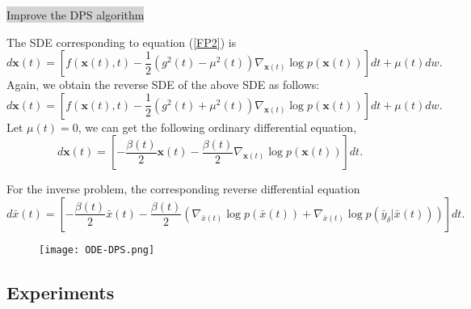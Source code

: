 \documentclass[mathserif,envcountsect,compress,8pt]{beamer}
\begin{document}
\begin{frame}
	\setlength{\parskip}{0.6\baselineskip}
	\colorbox {lightgray}{{\color{blue}Improve the DPS algorithm}}
	
	\vspace{20pt}
	
	The SDE corresponding to equation (\ref{FP2}) is
	\begin{equation*}
		d\mathbf{x}(t)=[f(\mathbf{x}(t),t)-\frac{1}{2}(g^2(t)-\mu^2(t))\nabla_{\mathbf{x}(t)}\log p(\mathbf{x}(t))]dt+\mu(t)dw.
	\end{equation*}
	Again, we obtain the reverse SDE of the above SDE as follows:
	\begin{equation*}
		d\mathbf{x}(t)=[f(\mathbf{x}(t),t)-\frac{1}{2}(g^2(t)+\mu^2(t))\nabla_{\mathbf{x}(t)}\log p(\mathbf{x}(t))]dt+\mu(t)dw.
	\end{equation*}
	Let $\mu(t)=0$, we can get the following ordinary differential equation,
	\begin{equation}\label{4.2}
		d\mathbf{x}(t) = [-\frac{\beta(t)}{2}\mathbf{x}(t)-\frac{\beta(t)}{2}\nabla_{\mathbf{x}(t)}\log p(\mathbf{x}(t))]dt.
	\end{equation}
	
	For the inverse problem, the corresponding reverse differential equation
	\begin{equation}\label{eqODE}
		d\bar{x}(t) = [-\frac{\beta(t)}{2}\bar{x}(t)-\frac{\beta(t)}{2}(\nabla_{\bar{x}(t)}\log p(\bar{x}(t))+\nabla_{\bar{x}(t)}\log p(\bar{y}_{\delta}|\bar{x}(t)))]dt.
	\end{equation}
\end{frame}

\begin{frame}
	\setlength{\parskip}{0.6\baselineskip}
	
	\begin{figure}[H]
		\centering
		\begin{minipage}[t]{0.8\linewidth}
			\centering
			\texttt{[image: ODE-DPS.png]}
		\end{minipage}
		\centering
		\label{fig_1}
	\end{figure}
\end{frame}


\subsection{Experiments}
\end{document}
